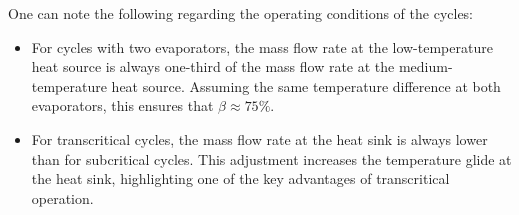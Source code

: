 One can note the following regarding the operating conditions of the cycles:

\begin{itemize}
    \item For cycles with two evaporators, the mass flow rate at the 
    low-temperature heat source is always one-third of the mass flow    
    rate at the medium-temperature heat source. Assuming the same 
    temperature difference at both evaporators, this ensures that $\beta \approx 75\%$.
    \item For transcritical cycles, the mass flow rate at the heat 
    sink is always lower than for subcritical cycles. This adjustment 
    increases the temperature glide at the heat sink, highlighting 
    one of the key advantages of transcritical operation.
\end{itemize}